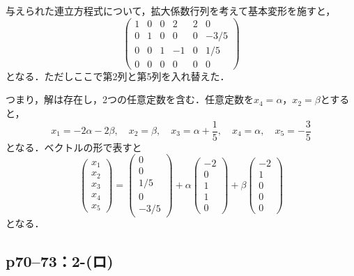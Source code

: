 \documentclass[a4paper,10pt,fleqn]{ltjsarticle}
\begin{document}
\begin{tleftbar}
    与えられた連立方程式について，拡大係数行列を考えて基本変形を施すと，
    \[
        \begin{pmatrix} 1 & 0 & 0 & 2 & 2 & 0 \\ 0 & 1& 0 & 0 & 0 & -3/5 \\ 0 & 0 & 1 & -1 & 0 & 1/5 \\ 0 & 0 & 0 & 0 & 0 & 0 \end{pmatrix}
    \]
    となる．ただしここで第2列と第5列を入れ替えた．

    つまり，解は存在し，2つの任意定数を含む．任意定数を$x_4 = \alpha$，$x_2 = \beta $とすると，
    \[
        x_1 = -2 \alpha - 2 \beta , \quad x_2 =\beta , \quad x_3 = \alpha + \frac{1}{5} , \quad x_4 = \alpha , \quad x_5 = -\frac{3}{5}
    \]
    となる．ベクトルの形で表すと
    \[
        \begin{pmatrix} x_1 \\ x_2 \\ x_3 \\ x_4 \\ x_5 \end{pmatrix}= \begin{pmatrix} 0 \\ 0 \\ 1/5 \\ 0 \\ -3/5 \end{pmatrix} + \alpha \begin{pmatrix} -2 \\ 0 \\ 1 \\ 1 \\ 0 \end{pmatrix} + \beta \begin{pmatrix} -2 \\ 1 \\ 0 \\ 0 \\ 0 \end{pmatrix}
    \]
    となる．
\end{tleftbar}

\subsection*{p70--73：2-(ロ)}
\end{document}
